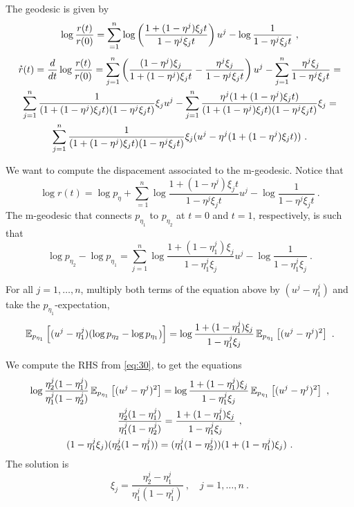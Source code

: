 \documentclass[12pt,a4paper]{amsart}
\theoremstyle{remark}
\begin{document}
The geodesic is given by 
\begin{equation}
  \label{eq:42}
  \log \frac{r(t)}{r(0)} = \sum_{=1}^n \log\left(\frac{1 + (1-\eta^j) \xi_j t}{1 -\eta^j\xi_j t}\right) u^j - \log \frac1{1 -\eta^j\xi_j t} \ ,
\end{equation}
\begin{multline}
  \accentset{\star}{r}(t) = \frac{d}{dt} \log \frac{r(t)}{r(0)} = \sum_{j=1}^n \left(\frac{(1 -\eta^j)\xi_j}{1 + (1-\eta^j) \xi_j t} - \frac{\eta^j\xi_j}{1 - \eta^j \xi_j t} \right) u^j - \sum_{j=1}^n \frac{\eta^j\xi_j}{1-\eta^j\xi_jt} = \\
  \sum_{j=1}^n \frac{1}{(1 + (1-\eta^j) \xi_j t)(1 - \eta^j \xi_j t)} \xi_j u^j 
- \sum_{j=1}^n \frac{\eta^j(1 + (1-\eta^j) \xi_j t)}{(1 + (1-\eta^j) \xi_j t)(1 - \eta^j \xi_j t)} \xi_j  = \\
 \sum_{j=1}^n \frac{1}{(1 + (1-\eta^j) \xi_j t)(1 - \eta^j \xi_j t)} \xi_j (u^j - \eta^j(1 + (1-\eta^j) \xi_j t)) \ . \end{multline}

We want to compute the dispacement associated to the m-geodesic. Notice that
\begin{equation}
  \label{eq:45}
   \log r(t) = \log p_\eta + \sum_{=1}^n \log \frac{1 + (1-\eta^j) \xi_j t}{1 -\eta^j\xi_j t} u^j - \log \frac1{1 -\eta^j\xi_j t} \ . 
 \end{equation}
 The m-geodesic that connects $p_{\eta_1}$ to $p_{\eta_2}$ at $t=0$ and $t=1$, respectively, is such that
 \begin{equation}
   \label{eq:46}
   \log p_{\eta_2} - \log p_{\eta_1} = \sum_{j=1}^n \log \frac{1 + (1-\eta^j_1) \xi_j}{1 -\eta^j_1\xi_j} u^j - \log \frac1{1 -\eta^j_1\xi_j} \ .
 \end{equation}
 
 For all $j = 1,\dots,n$, multiply both terms of the equation above by $(u^j - \eta_1^j)$ and take the $p_{\eta_1}$-expectation,
 \begin{equation}
   \label{eq:43}
   \operatorname{\mathbb E}_{p_{\eta_1}}\left[(u^j-\eta^j_1)(\log p_{\eta_2} - \log p_{\eta_1})\right] = \log \frac{1 + (1-\eta^j_1) \xi_j}{1 -\eta^j_1\xi_j} \operatorname{\mathbb E}_{p_{\eta_1}}\left[(u^j - \eta^j)^2\right] \ .
 \end{equation}
 
 We compute the RHS from \cref{eq:30}, to get the equations
 \begin{gather}
   \label{eq:47}
   \log \frac {\eta^j_2(1 - \eta^j_1)}{\eta^j_1 (1- \eta^j_2)} \operatorname{\mathbb E}_{p_{\eta_1}}\left[(u^j - \eta^j)^2\right] = \log \frac{1 + (1-\eta^j_1) \xi_j}{1 -\eta^j_1\xi_j} \operatorname{\mathbb E}_{p_{\eta_1}}\left[(u^j - \eta^j)^2\right] \ , \\
   \frac {\eta^j_2(1 - \eta^j_1)}{\eta^j_1 (1- \eta^j_2)} = \frac{1 + (1-\eta^j_1) \xi_j}{1 -\eta^j_1\xi_j} \ , \\
 (1 -\eta^j_1\xi_j)(\eta^j_2(1 - \eta^j_1)) = (\eta^j_1 (1- \eta^j_2))(1 + (1-\eta^j_1) \xi_j) \ .
 \end{gather}
The solution is
\begin{equation}
  \label{eq:52}
  \xi_j = \frac{\eta^j_2-\eta^j_1}{\eta^j_1(1-\eta^j_1)} \ , \quad j=1,\dots,n \ .
\end{equation}
\end{document}
